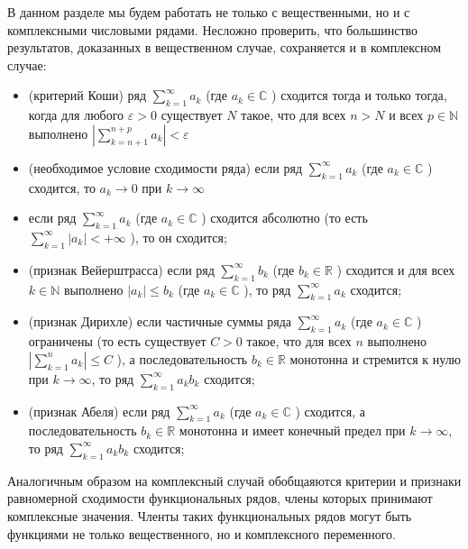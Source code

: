 \documentclass[a4paper,12pt]{article} %
\begin{document}
В данном разделе мы будем работать не только с вещественными, но и с комплексными числовыми рядами. Несложно проверить, что большинство результатов, доказанных в вещественном случае, сохраняется и в комплексном случае:

\begin{itemize}
	\item (критерий Коши) ряд $\sum_{k=1}^{\infty} a_{k}$ (где $a_{k} \in \mathbb{C}$ ) сходится тогда и только тогда, когда для любого $\varepsilon>0$ существует $N$ такое, что для всех $n>N$ и всех $p \in \mathbb{N}$ выполнено $\left|\sum_{k=n+1}^{n+p} a_{k}\right|<\varepsilon$

	\item (необходимое условие сходимости ряда) если ряд $\sum_{k=1}^{\infty} a_{k}$ (где $a_{k} \in \mathbb{C}$ ) сходится, то $a_{k} \rightarrow 0$ при $k \rightarrow \infty$

	\item если ряд $\sum_{k=1}^{\infty} a_{k}$ (где $a_{k} \in \mathbb{C}$ ) сходится абсолютно (то есть $\sum_{k=1}^{\infty}\left|a_{k}\right|<+\infty$ ), то он сходится;

	\item (признак Вейерштрасса) если ряд $\sum_{k=1}^{\infty} b_{k}$ (где $b_{k} \in \mathbb{R}$ ) сходится и для всех $k \in \mathbb{N}$ выполнено $\left|a_{k}\right| \leq b_{k}$ (где $a_{k} \in \mathbb{C}$ ), то ряд $\sum_{k=1}^{\infty} a_{k}$ сходится;

	\item (признак Дирихле) если частичные суммы ряда $\sum_{k=1}^{\infty} a_{k}$ (где $a_{k} \in \mathbb{C}$ ) ограничены (то есть существует $C>0$ такое, что для всех $n$ выполнено $\left|\sum_{k=1}^{n} a_{k}\right| \leq C$ ), а последовательность $b_{k} \in \mathbb{R}$ монотонна и стремится к нулю при $k \rightarrow \infty$, то ряд $\sum_{k=1}^{\infty} a_{k} b_{k}$ сходится;

	\item (признак Абеля) если ряд $\sum_{k=1}^{\infty} a_{k}$ (где $a_{k} \in \mathbb{C}$ ) сходится, а последовательность $b_{k} \in \mathbb{R}$ монотонна и имеет конечный предел при $k \rightarrow \infty$, то ряд $\sum_{k=1}^{\infty} a_{k} b_{k}$ сходится;

\end{itemize}

Аналогичным образом на комплексный случай обобщаяются критерии и признаки равномерной сходимости функциональных рядов, члены которых принимают комплексные значения. Членты таких функциональных рядов могут быть функциями не только вещественного, но и комплексного переменного.
\end{document}

